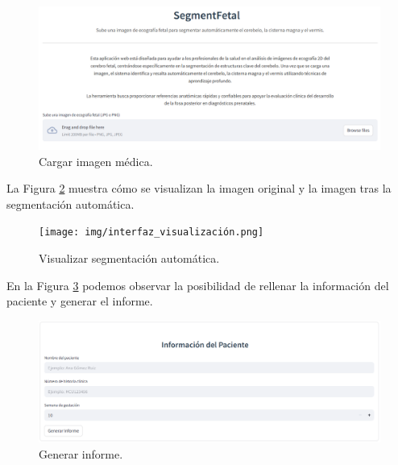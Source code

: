 \begin{figure}[h]
    \centering
    \includegraphics[width=1\textwidth]{img/interfaz_subir_imagen.png}
    \caption{Cargar imagen médica.}
    \label{fig:subir_imagen}
\end{figure}

La Figura \ref{fig:visualizar_segmentación} muestra cómo se visualizan la imagen original y la imagen tras la segmentación automática.

\begin{figure}[h]
    \centering
    \texttt{[image: img/interfaz\_visualización.png]}
    \caption{Visualizar segmentación automática.}
    \label{fig:visualizar_segmentación}
\end{figure}

En la Figura \ref{fig: generar_informe} podemos observar la posibilidad de rellenar la información del paciente y generar el informe.

\begin{figure}[h]
    \centering
    \includegraphics[width=1\textwidth]{img/interfaz_generar_informe.png}
    \caption{Generar informe.}
    \label{fig: generar_informe}
\end{figure}